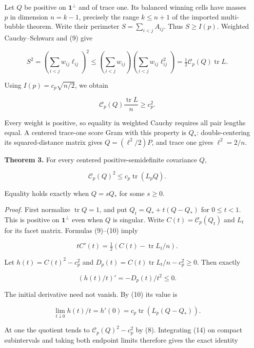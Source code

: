 \documentclass[
  11pt,
]{article}
\begin{document}
Let \(Q\) be positive on \(\mathbf1^\perp\) and of trace one. Its
balanced winning cells have masses \(p\) in dimension \(n=k-1\),
precisely the range \(k\le n+1\) of the imported multi-bubble theorem.
Write their perimeter \(S=\sum_{i<j}A_{ij}\). Thus \(S\ge I(p)\).
Weighted Cauchy--Schwarz and (9) give

\[
 S^2=\left(\sum_{i<j}w_{ij}\ell_{ij}\right)^2
 \le\left(\sum_{i<j}w_{ij}\right)
                    \left(\sum_{i<j}w_{ij}\ell_{ij}^2\right)
 =\tfrac12\mathcal C_p(Q)\operatorname{tr}L.
\]

Using \(I(p)=c_p\sqrt{n/2}\), we obtain

\[
                   \mathcal C_p(Q)\frac{\operatorname{tr}L}{n}
                              \ge c_p^2.                \tag{11}
\]

Every weight is positive, so equality in weighted Cauchy requires all
pair lengths equal. A centered trace-one score Gram with this property
is \(Q_*\): double-centering its squared-distance matrix gives
\(Q=(\ell^2/2)P\), and trace one gives \(\ell^2=2/n\).

\textbf{Theorem 3.} For every centered positive-semidefinite covariance
\(Q\),

\[
                  \mathcal C_p(Q)^2\le c_p\operatorname{tr}(L_pQ).
                                                               \tag{12}
\]

Equality holds exactly when \(Q=sQ_*\) for some \(s\ge0\).

\emph{Proof.} First normalize \(\operatorname{tr}Q=1\), and put
\(Q_t=Q_*+t(Q-Q_*)\) for \(0\le t<1\). This is positive on
\(\mathbf1^\perp\) even when \(Q\) is singular. Write
\(C(t)=\mathcal C_p(Q_t)\) and \(L_t\) for its facet matrix. Formulas
(9)--(10) imply

\[
              tC'(t)=\tfrac12\left(C(t)-\operatorname{tr}L_t/n\right).
                                                               \tag{13}
\]

Let \(h(t)=C(t)^2-c_p^2\) and
\(D_p(t)=C(t)\operatorname{tr}L_t/n-c_p^2\ge0\). Then exactly

\[
                     (h(t)/t)'=-D_p(t)/t^2\le0.           \tag{14}
\]

The initial derivative need not vanish. By (10) its value is

\[
 \lim_{t\downarrow0}h(t)/t=h'(0)
                      =c_p\operatorname{tr}(L_p(Q-Q_*)).  \tag{15}
\]

At one the quotient tends to \(\mathcal C_p(Q)^2-c_p^2\) by (8).
Integrating (14) on compact subintervals and taking both endpoint limits
therefore gives the exact identity
\end{document}

